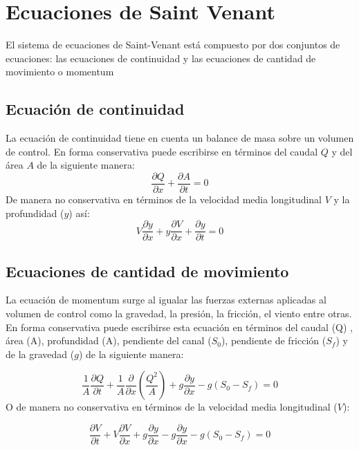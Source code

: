 \section{Ecuaciones de Saint Venant}
El sistema de ecuaciones de Saint-Venant está compuesto por dos conjuntos de ecuaciones: las ecuaciones de continuidad y las ecuaciones de cantidad de movimiento o momentum

\subsection{Ecuación de continuidad} 
La ecuación de continuidad tiene en cuenta un balance de masa sobre un volumen de control. En forma conservativa puede escribirse en términos del caudal $Q$ y del área $A$ de la siguiente manera:
\begin{equation}
    \frac{\partial Q}{\partial x} + \frac{\partial A}{\partial t} = 0
\end{equation}
De manera no conservativa en términos de la velocidad media longitudinal $V$ y la profundidad ($y$) así:
\begin{equation}
    V \frac{\partial y}{\partial x} + y \frac{\partial V}{\partial x} + \frac{\partial y}{\partial t} = 0
\end{equation}

\subsection{Ecuaciones de cantidad de movimiento}

La ecuación de momentum surge al igualar las fuerzas externas aplicadas al
volumen de control como la gravedad, la presión, la fricción, el viento entre
otras. En forma conservativa puede escribirse esta ecuación en términos del
caudal (Q) , área (A), profundidad (A), pendiente del canal ($S_0$),
pendiente de fricción ($S_f$)  y de la gravedad ($g$) de la siguiente manera:

\begin{equation}
    \frac{1}{A} \frac{\partial Q}{\partial t} + \frac{1}{A} \frac{\partial }{\partial x} \left(\frac{Q^2}{A}\right) + g \frac{\partial y}{\partial x} - g\left(S_0 - S_f \right) = 0
\end{equation}
O de manera no conservativa en términos de la velocidad media longitudinal ($V$):

\begin{equation}
    \frac{\partial V}{\partial t} + V \frac{\partial V}{\partial x} + g \frac{\partial y}{\partial x} - g \frac{\partial y}{\partial x} - g\left(S_0 - S_f \right) = 0
\end{equation}

